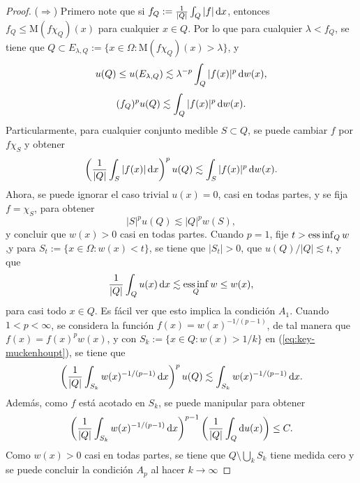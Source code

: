 \begin{proof}
	($\Rightarrow$) Primero note que si $f_Q := \frac{1}{|Q|} \int_Q |f|\mathop{}\!\mathrm{d} x$, entonces $f_Q\leq \mathrm{M}(f\chi_Q)(x)$ para cualquier $x\in Q$. Por lo que para cualquier $\lambda < f_Q$, se tiene que $Q\subset E_{\lambda, Q} := \{x\in\Omega: \mathrm{M}(f\chi_Q)(x)>\lambda\}$, y 
	\begin{equation*}
		u(Q) \leq u(E_{\lambda,Q}) \lesssim \lambda^{-p} \int_Q |f(x)|^p\mathop{}\!\mathrm{d} w(x),
	\end{equation*}
	\begin{equation*}
		(f_Q)^pu(Q) \lesssim \int_Q |f(x)|^p\mathop{}\!\mathrm{d} w(x).
	\end{equation*}
	Particularmente, para cualquier conjunto medible $S\subset Q$, se puede cambiar $f$ por $f\chi_S$ y obtener 
	\begin{equation}\label{eq:key-muckenhoupt}
		\left(\frac{1}{|Q|}\int_S |f(x)|\mathop{}\!\mathrm{d} x \right)^p u(Q) \lesssim \int_S |f(x)|^p\mathop{}\!\mathrm{d} w(x).
	\end{equation}
	Ahora, se puede ignorar el caso trivial $u(x) = 0$, casi en todas partes, y se fija $f=\chi_S$, para obtener 
	\begin{equation*}
		|S|^p u(Q) \lesssim|Q|^p w(S),
	\end{equation*}
	y concluir que $w(x)>0$ casi en todas partes. Cuando $p=1$, fije $t > \operatorname*{ess\,inf}_Q w$ ,y para $S_t := \{x\in\Omega: w(x)<t\}$, se tiene que $|S_t|>0$, que $u(Q)/|Q| \lesssim t$, y que 
	\begin{equation*}
		\frac{1}{|Q|}\int_Q u(x)\mathop{}\!\mathrm{d} x \lesssim \operatorname*{ess\,inf}_Q w \leq w(x),
	\end{equation*}
	para casi todo $x\in Q$. Es fácil ver que esto implica la condición $A_1$. Cuando $1<p<\infty$, se considera la función $f(x) = w(x)^{-1/(p-1)}$, de tal manera que $f(x) = f(x)^pw(x)$, y con $S_k:=\{x\in Q: w(x) > 1/k\}$ en (\ref{eq:key-muckenhoupt}), se  tiene que 
	\begin{equation*}
		\left(\frac{1}{|Q|}\int_{S_k} w(x)^{-1/(p-1)}\mathop{}\!\mathrm{d} x \right)^p u(Q) \lesssim \int_{S_k} w(x)^{-1/(p-1)}\mathop{}\!\mathrm{d} x.
	\end{equation*}
	Además, como $f$ está acotado en $S_k$, se puede manipular para obtener
	\begin{equation*}
		\left(\frac{1}{|Q|}\int_{S_k} w(x)^{-1/(p-1)}\mathop{}\!\mathrm{d} x \right)^{p-1} \left(\frac{1}{|Q|}\int_Q\mathop{}\!\mathrm{d} u(x)\right) \leq C.
	\end{equation*}
	Como $w(x)>0$ casi en todas partes, se tiene que $Q\setminus\bigcup_kS_k$ tiene medida cero y se puede concluir la condición $A_p$ al hacer $k\to\infty$

\end{proof}
